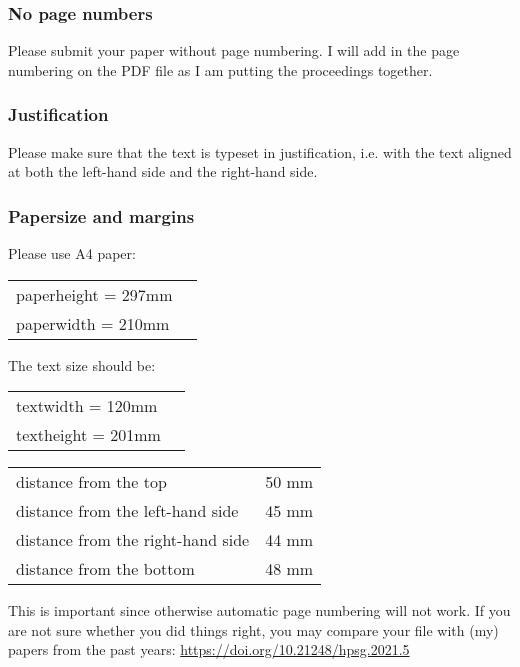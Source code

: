 \documentclass[11pt,a4paper,fleqn]{article}
\begin{document}
\subsubsection{No page numbers}

Please submit your paper without page numbering.  I will add in
the page numbering on the PDF file as I am putting the
proceedings together.

\subsubsection{Justification}

Please make sure that the text is typeset in justification,
i.e. with the text aligned at both the left-hand side and the right-hand side.

\subsubsection{Papersize and margins}
\label{margins}

Please use A4 paper:
\begin{table}[H]
\begin{tabular}{@{}ll}
paperheight  = 297mm\\
paperwidth   = 210mm
\end{tabular}
\end{table}
%
The text size should be:
\begin{table}[H]
\begin{tabular}{@{}ll}
textwidth  = 120mm\\
textheight = 201mm
\end{tabular}
\end{table}

\begin{table}[H]
\begin{tabular}{@{}l@{ = }l}
distance from the top & 50 mm\\
distance from the left-hand side & 45 mm\\
distance from the right-hand side & 44 mm\\
distance from the bottom & 48 mm\\
\end{tabular}
\end{table}

This is important since otherwise automatic page numbering will not work.
If you are not sure whether you did things right, you may compare your file
with (my) papers from the past years:\newline 
\url{https://doi.org/10.21248/hpsg.2021.5}
\end{document}
